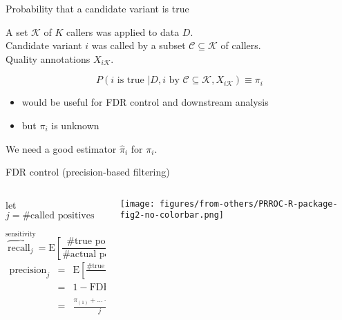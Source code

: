 \documentclass{beamer} %
\begin{document}
\begin{frame}{Probability that a candidate variant is true}

A set \(\mathcal{K}\) of \(K\) callers was applied to data \(D\).\\
Candidate variant \(i\) was called by a subset \(\mathcal{C}\subseteq\mathcal{K}\)
of callers. \\
Quality annotations \(X_{i\mathcal{K}}\).

\[
P(i \text{ is true } | D, i \text{ by }
\mathcal{C}\subseteq\mathcal{K}, X_{i\mathcal{K}}) \equiv \pi_{i}
\]
\begin{itemize}
\item would be useful for FDR control and downstream analysis
\item<2> but \(\pi_i\) is unknown
\end{itemize}

\bigskip
{
\begin{center}
\Large We need a good estimator \(\hat{\pi}_{i}\) for \(\pi_{i}\).
\end{center}
}
\end{frame}

\begin{frame}{FDR control (precision-based filtering)}
\begin{columns}[t]
\small
\begin{column}{0.45\textwidth}
\begin{center}
{let \(j = \text{\# called positives}\) }
\medskip
\end{center}
\[
\overbrace{\text{recall}_j}^{\text{sensitivity}} = \text{E} \left[
\frac{\text{\# true positives}}{\text{\# actual positives}} \right]
\]
\medskip
\begin{eqnarray*}
\text{precision}_j &=& \text{E} \left[ \frac{\text{\# true positives}}{j} \right] \\
&=& 1 - \text{FDR}_j \\
&=& \frac{\pi_{(1)} + ... + \pi_{(j)}}{j}
\end{eqnarray*}
\end{column}
\begin{column}{0.55\textwidth}

\texttt{[image: figures/from-others/PRROC-R-package-fig2-no-colorbar.png]}
\end{column}
\end{columns}
\end{frame}
\end{document}
